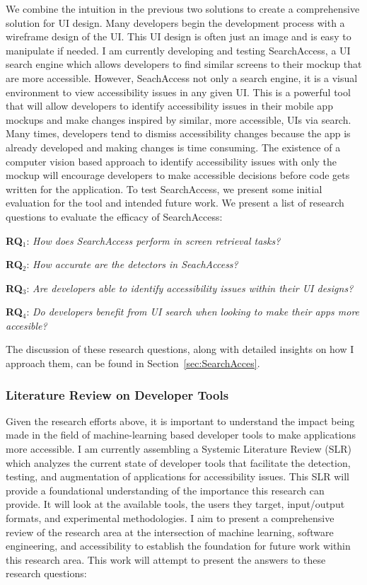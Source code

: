 We combine the intuition in the previous two solutions to create a comprehensive solution for UI design. Many developers begin the development process with a wireframe design of the UI. This UI design is often just an image and is easy to manipulate if needed. I am currently developing and testing SearchAccess, a UI search engine which allows developers to find similar screens to their mockup that are more accessible. However, SeachAccess not only a search engine, it is a visual environment to view accessibility issues in any given UI. This is a powerful tool that will allow developers to identify accessibility issues in their mobile app mockups and make changes inspired by similar, more accessible, UIs via search. Many times, developers tend to dismiss accessibility changes because the app is already developed and making changes is time consuming. The existence of a computer vision based approach to identify accessibility issues with only the mockup will encourage developers to make accessible decisions before code gets written for the application. To test SearchAccess, we present some initial evaluation for the tool and intended future work. We present a list of research questions to evaluate the efficacy of SearchAccess: 

\begin{description}
  
    \item \textbf{RQ$_1$}: \textit{How does SearchAccess perform in screen retrieval tasks?}
    \item \textbf{RQ$_2$}: \textit{How accurate are the detectors in SeachAccess?}
    \item \textbf{RQ$_3$}: \textit{Are developers able to identify accessibility issues within their UI designs?}
    \item \textbf{RQ$_4$}: \textit{Do developers benefit from UI search when looking to make their apps more accesible?}
 \end{description}
The discussion of these research questions, along with detailed insights on how I approach them, can be found in Section~\ref{sec:SearchAcces}.


\subsubsection{Literature Review on Developer Tools}

Given the research efforts above, it is important to understand the impact being made in the field of machine-learning based developer tools to make applications more accessible. I am currently assembling a Systemic Literature Review (SLR) which analyzes the current state of developer tools that facilitate the detection, testing, and augmentation of applications for accessibility issues. This SLR will provide a foundational understanding of the importance this research can provide. It will look at the available tools, the users they target, input/output formats, and experimental methodologies. I aim to present a comprehensive review of the research area at the intersection of machine learning, software engineering, and accessibility to establish the foundation for future work within this research area. This work will attempt to present the answers to these research questions: 

